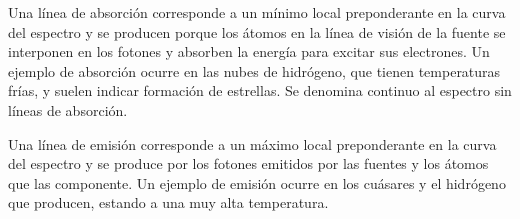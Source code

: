 Una línea de absorción corresponde a un mínimo local preponderante en la curva del espectro y se producen porque los átomos en la línea de visión de la fuente se interponen en los fotones y absorben la energía para excitar sus electrones. Un ejemplo de absorción ocurre en las nubes de hidrógeno, que tienen temperaturas frías, y suelen indicar formación de estrellas. Se denomina continuo al espectro sin líneas de absorción.

Una línea de emisión corresponde a un máximo local preponderante en la curva del espectro y se produce por los fotones emitidos por las fuentes y los átomos que las componente. Un ejemplo de emisión ocurre en los cuásares y el hidrógeno que producen, estando a una muy alta temperatura.

